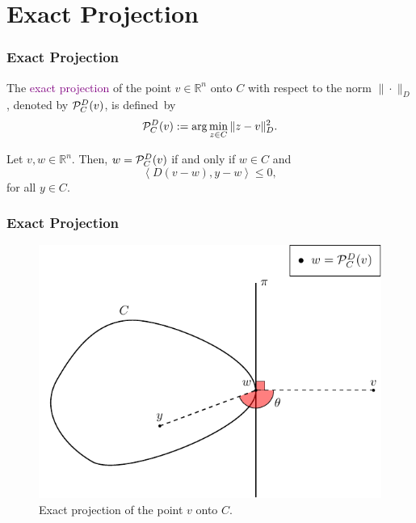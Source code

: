 \section{Exact Projection}

\begin{frame}[t]\frametitle{Exact Projection}

  \begin{definition}[2.1]
    The \textcolor{purple}{exact  projection} of the point $v\in \mathbb{R}^{n}$ onto $C$ with respect to the norm $\| \cdot \| _{D}$, denoted by  ${\cal P}_{C}^{D}(v)$, is  defined~by
    \begin{equation*}
      {\cal P}_{C}^{D}(v):=\arg \min _{z\in C}\|z-v\|^2_{D}.
    \end{equation*}
  \end{definition}

  \bigskip
  \bigskip
  \bigskip

  \begin{lemma}[2.2]
    Let $v, w \in {\mathbb R}^n$.  Then,  $w={\cal P}_{C}^{D}(v)$ if and only if  $w\in C$ and
    \[
      \left\langle D(v-w), y-w\right\rangle \leq  0,
    \]
    for all $y \in C.$
  \end{lemma}
\end{frame}

\begin{frame}[t]\frametitle{Exact Projection}\bigskip
  \begin{figure}[!ht]
    \centering
    \includegraphics{../figures/exactProj.pdf}
    \caption{Exact projection of the point $v$ onto $C$.}
    \label{fig:exactProj}
  \end{figure}
\end{frame}

